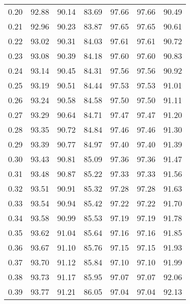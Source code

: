 \begin{tabular}{|c|c|c|c|c|c|c|}
      0.20 &     92.88 &     90.14 &      83.69 &   97.66 &      97.66 &         90.49 \\
      0.21 &     92.96 &     90.23 &      83.87 &   97.65 &      97.65 &         90.61 \\
      0.22 &     93.02 &     90.31 &      84.03 &   97.61 &      97.61 &         90.72 \\
      0.23 &     93.08 &     90.39 &      84.18 &   97.60 &      97.60 &         90.83 \\
      0.24 &     93.14 &     90.45 &      84.31 &   97.56 &      97.56 &         90.92 \\
      0.25 &     93.19 &     90.51 &      84.44 &   97.53 &      97.53 &         91.01 \\
      0.26 &     93.24 &     90.58 &      84.58 &   97.50 &      97.50 &         91.11 \\
      0.27 &     93.29 &     90.64 &      84.71 &   97.47 &      97.47 &         91.20 \\
      0.28 &     93.35 &     90.72 &      84.84 &   97.46 &      97.46 &         91.30 \\
      0.29 &     93.39 &     90.77 &      84.97 &   97.40 &      97.40 &         91.39 \\
      0.30 &     93.43 &     90.81 &      85.09 &   97.36 &      97.36 &         91.47 \\
      0.31 &     93.48 &     90.87 &      85.22 &   97.33 &      97.33 &         91.56 \\
      0.32 &     93.51 &     90.91 &      85.32 &   97.28 &      97.28 &         91.63 \\
      0.33 &     93.54 &     90.94 &      85.42 &   97.22 &      97.22 &         91.70 \\
      0.34 &     93.58 &     90.99 &      85.53 &   97.19 &      97.19 &         91.78 \\
      0.35 &     93.62 &     91.04 &      85.64 &   97.16 &      97.16 &         91.85 \\
      0.36 &     93.67 &     91.10 &      85.76 &   97.15 &      97.15 &         91.93 \\
      0.37 &     93.70 &     91.12 &      85.84 &   97.10 &      97.10 &         91.99 \\
      0.38 &     93.73 &     91.17 &      85.95 &   97.07 &      97.07 &         92.06 \\
      0.39 &     93.77 &     91.21 &      86.05 &   97.04 &      97.04 &         92.13 \\

\end{tabular}
